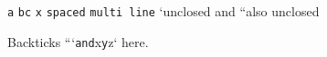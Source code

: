 \texttt{a} \texttt{b\textasciigrave{}c}
\texttt{\textasciigrave{}\textasciigrave{}x\textasciigrave{}\textasciigrave{}}
\texttt{\textasciigrave{}} \texttt{spaced} \texttt{multi\ line}
`unclosed and ``also unclosed

Backticks ```\texttt{and}x\texttt{y}z` here.
